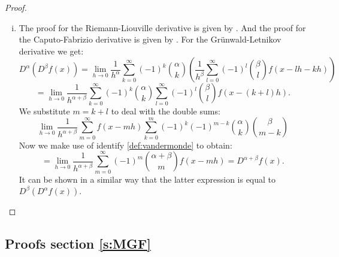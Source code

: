 \begin{proof}
\begin{enumerate}[(i)]
        \item The proof for the Riemann-Liouville derivative is given by \citet{koning15}. And the proof for the Caputo-Fabrizio derivative is given by \citet{losada15}. For the Grünwald-Letnikov derivative we get:
        \[ D^\alpha(D^\beta f(x)) = \lim_{h \to 0} \frac{1}{h^\alpha} \sum_{k=0}^\infty (-1)^k \binom{\alpha}{k} \left( \frac{1}{h^\beta} \sum_{l=0}^\infty (-1)^l \binom{\beta}{l} f(x - l h - kh)\right)\]
        \[= \lim_{h \to 0} \frac{1}{h^{\alpha + \beta}} \sum_{k=0}^\infty (-1)^k \binom{\alpha}{k} \sum_{l=0}^\infty (-1)^l \binom{\beta}{l} f(x - (k + l)h).\] We substitute \(m = k + l\) to deal with the double sums: 
        \[ \lim_{h \to 0} \frac{1}{h^{\alpha + \beta}} \sum_{m=0}^\infty f(x - mh)  \sum_{k=0}^m (-1)^k (-1)^{ m - k} \binom{\alpha}{k} \binom{\beta}{m - k}\] Now we make use of identify \ref{def:vandermonde} to obtain:
        \[ = \lim_{h \to 0} \frac{1}{h^{\alpha + \beta}} \sum_{m=0}^\infty (-1)^m \binom{\alpha + \beta}{m} f(x - mh) = D^{\alpha + \beta} f(x).\]
        It can be shown in a similar way that the latter expression is equal to \(D^\beta(D^\alpha f(x))\).

        
    \end{enumerate}
\end{proof}

\subsection{Proofs section \ref{s:MGF}} \label{pf:MGF}

